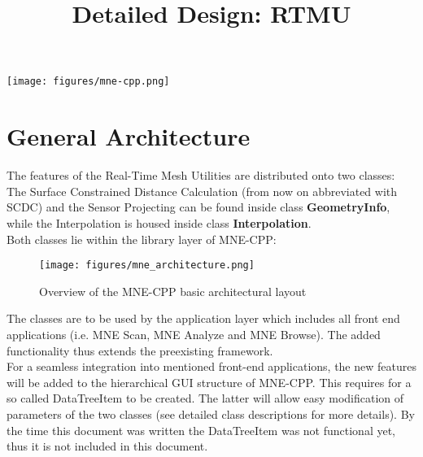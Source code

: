 





	
\title{Detailed Design: RTMU}
\vspace{3 in}
\maketitle

\texttt{[image: figures/mne-cpp.png]}

\clearpage


\tableofcontents

\clearpage
\section{General Architecture}
The features of the Real-Time Mesh Utilities are distributed onto two classes: The Surface Constrained Distance Calculation (from now on abbreviated with SCDC) and the Sensor Projecting can be found inside class \textbf{GeometryInfo}, while the Interpolation is housed inside class \textbf{Interpolation}.\\
Both classes lie within the library layer of MNE-CPP:

\begin{figure}[h]
	\begin{center}
		\texttt{[image: figures/mne\_architecture.png]}
		\caption{Overview of the MNE-CPP basic architectural layout}
	\end{center}
\end{figure}

The classes are to be used by the application layer which includes all front end applications (i.e. MNE Scan, MNE Analyze and MNE Browse).
The added functionality thus extends the preexisting framework.\\
For a seamless integration into mentioned front-end applications, the new features will be added to the hierarchical GUI structure of MNE-CPP. This requires for a so called DataTreeItem to be created. The latter will allow easy modification of parameters of the two classes (see detailed class descriptions for more details). By the time this document was written the DataTreeItem was not functional yet, thus it is not included in this document.


\clearpage

